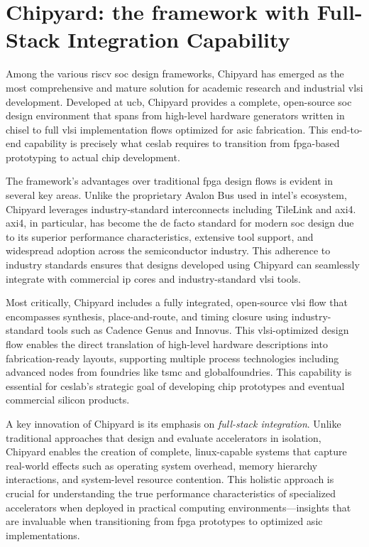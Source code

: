 \section{Chipyard: the framework with Full-Stack Integration Capability}

Among the various \acrshort{riscv} \acrshort{soc} design frameworks, Chipyard has emerged as the most comprehensive and mature solution for academic research and industrial \acrshort{vlsi} development. Developed at \acrshort{ucb}, Chipyard provides a complete, open-source \acrshort{soc} design environment that spans from high-level hardware generators written in \acrshort{chisel} to full \acrshort{vlsi} implementation flows optimized for \acrshort{asic} fabrication. This end-to-end capability is precisely what \acrshort{ceslab} requires to transition from \acrshort{fpga}-based prototyping to actual chip development.

The framework's advantages over traditional \acrshort{fpga} design flows is evident in several key areas. Unlike the proprietary Avalon Bus used in \acrshort{intel}'s ecosystem, Chipyard leverages industry-standard interconnects including TileLink and \acrshort{axi4}. \acrshort{axi4}, in particular, has become the de facto standard for modern \acrshort{soc} design due to its superior performance characteristics, extensive tool support, and widespread adoption across the semiconductor industry. This adherence to industry standards ensures that designs developed using Chipyard can seamlessly integrate with commercial \acrshort{ip} cores and industry-standard \acrshort{vlsi} tools.

Most critically, Chipyard includes a fully integrated, open-source \acrshort{vlsi} flow that encompasses synthesis, place-and-route, and timing closure using industry-standard tools such as Cadence Genus and Innovus. This \acrshort{vlsi}-optimized design flow enables the direct translation of high-level hardware descriptions into fabrication-ready layouts, supporting multiple process technologies including advanced nodes from foundries like \acrshort{tsmc} and \acrshort{globalfoundries}. This capability is essential for \acrshort{ceslab}'s strategic goal of developing chip prototypes and eventual commercial silicon products.

A key innovation of Chipyard is its emphasis on \textit{full-stack integration}. Unlike traditional approaches that design and evaluate accelerators in isolation, Chipyard enables the creation of complete, \acrshort{linux}-capable systems that capture real-world effects such as operating system overhead, memory hierarchy interactions, and system-level resource contention. This holistic approach is crucial for understanding the true performance characteristics of specialized accelerators when deployed in practical computing environments—insights that are invaluable when transitioning from \acrshort{fpga} prototypes to optimized \acrshort{asic} implementations.

